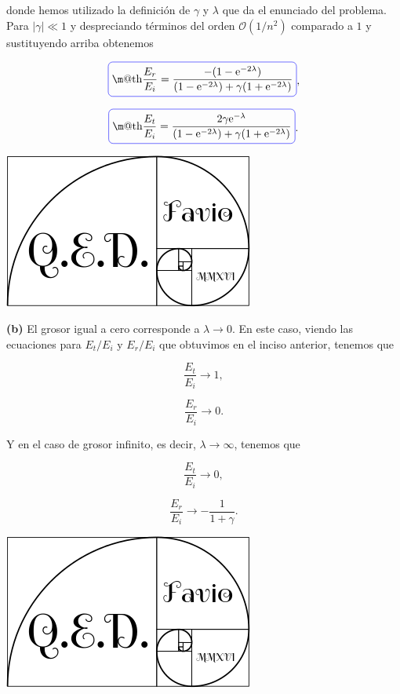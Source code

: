 \documentclass[a4paper,11pt]{article}
\makeatletter
\numberwithin{equation}{section}
\newcommand*{\boxcolor}{blue}
\renewcommand{\boxed}[1]{\textcolor{\boxcolor}{%
\tikz[baseline={([yshift=-1ex]current bounding box.center)}] \node [rectangle, minimum width=1ex,rounded corners,draw] {\normalcolor\m@th$\displaystyle#1$};}}
\newcommand{\euler}{\mathrm{e}}
\makeatother
\begin{document}
donde hemos utilizado la definición de $\gamma$ y $\lambda$ que da el enunciado del 
problema. Para $|\gamma| \ll 1$ y despreciando términos del orden $\mathcal{O}(1/n^2)$ 
comparado a $1$ y sustituyendo arriba obtenemos 

\begin{equation}
 \boxed{\frac{E_r}{E_i} = \frac{-(1 - \euler^{-2\lambda})}{(1 - \euler^{-2\lambda}) 
 + \gamma(1 + \euler^{-2\lambda})}},
\end{equation}

\begin{equation}
  \boxed{\frac{E_t}{E_i} = \frac{2\gamma \euler^{-\lambda}}{(1 - \euler^{-2\lambda}) 
 + \gamma(1 + \euler^{-2\lambda})}}.
\end{equation}

\hspace{10cm}\includegraphics[scale=0.25]{logoQED}

\textbf{(b)} El grosor igual a cero corresponde a $\lambda \rightarrow 0$. En este 
caso, viendo las ecuaciones para $E_t/E_i$ y $E_r/E_i$ que obtuvimos en 
el inciso anterior, tenemos que 

\begin{equation}
 \frac{E_t}{E_i} \rightarrow 1,
\end{equation}

\begin{equation}
 \frac{E_r}{E_i} \rightarrow 0.
\end{equation}

Y en el caso de grosor infinito, es decir, $\lambda \rightarrow \infty$, tenemos que 

\begin{equation}
 \frac{E_t}{E_i} \rightarrow 0,
\end{equation}

\begin{equation}
 \frac{E_r}{E_i} \rightarrow - \frac{1}{1 + \gamma}.
\end{equation}

\hspace{10cm}\includegraphics[scale=0.25]{logoQED}
\end{document}

